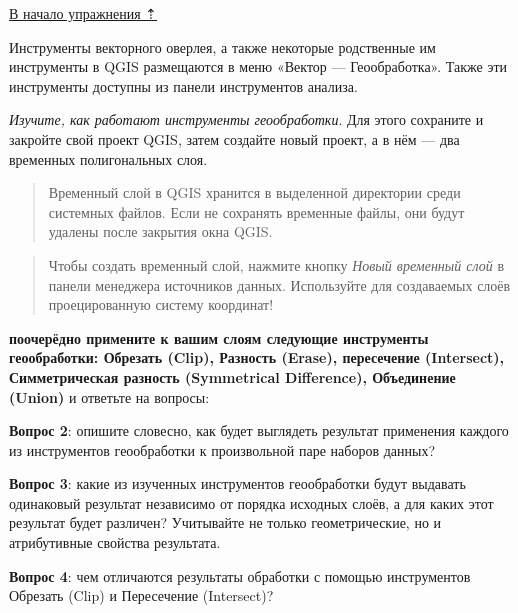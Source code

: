 \documentclass[
  12pt,
]{book}
\begin{document}
\protect\hyperlink{overlay}{В начало упражнения ⇡}

Инструменты векторного оверлея, а также некоторые родственные им инструменты в QGIS размещаются в меню «Вектор --- Геообработка». Также эти инструменты доступны из панели инструментов анализа.

\emph{Изучите, как работают инструменты геообработки}. Для этого сохраните и закройте свой проект QGIS, затем создайте новый проект, а в нём --- два временных полигональных слоя.

\begin{quote}
Временный слой в QGIS хранится в выделенной директории среди системных файлов. Если не сохранять временные файлы, они будут удалены после закрытия окна QGIS.
\end{quote}

\begin{quote}
Чтобы создать временный слой, нажмите кнопку \emph{Новый временный слой} в панели менеджера источников данных. Используйте для создаваемых слоёв проецированную систему координат!
\end{quote}

\textbf{поочерёдно примените к вашим слоям следующие инструменты геообработки: Обрезать (Clip), Разность (Erase), пересечение (Intersect), Симметрическая разность (Symmetrical Difference), Объединение (Union)} и ответьте на вопросы:

\textbf{Вопрос 2}: опишите словесно, как будет выглядеть результат применения каждого из инструментов геообработки к произвольной паре наборов данных?

\textbf{Вопрос 3}: какие из изученных инструментов геообработки будут выдавать одинаковый результат независимо от порядка исходных слоёв, а для каких этот результат будет различен? Учитывайте не только геометрические, но и атрибутивные свойства результата.

\textbf{Вопрос 4}: чем отличаются результаты обработки с помощью инструментов Обрезать (Clip) и Пересечение (Intersect)?
\end{document}
